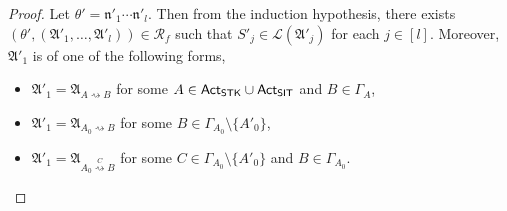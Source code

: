 \documentclass[preprint,12pt]{elsarticle}
\newcommand\act{{\sf Act}}
\newcommand\singletask{{\sf STK}}
\newcommand\singleinstance{{\sf SIT}}
\newcommand\aname{\mathfrak{n}}
\newcommand\AutReach{\mathscr{R}}
\newcommand\Aut{{\mathfrak{A} }}
\newcommand\Lang{{\mathscr{L} }}
\begin{document}
\begin{proof}
    Let $\theta'= \aname'_1 \cdots \aname'_l$. Then from the induction hypothesis, there exists $(\theta', (\Aut'_1, \dots, \Aut'_l)) \in \AutReach_f$ such that $S'_j \in \Lang(\Aut'_j)$ for each $j \in [l]$. Moreover, $\Aut'_1$ is of one of the following forms,
 \begin{itemize}
   \item  $\Aut'_1 = \Aut_{A \rightsquigarrow B}$ for some $A \in \act_\singletask \cup \act_\singleinstance$ and $B \in \Gamma_A$, 
   \item $\Aut'_1 = \Aut_{A_0 \rightsquigarrow B}$ for some $B \in \Gamma_{A_0} \setminus \{A'_0\}$, 
   \item $\Aut'_1 = \Aut_{A_0 \stackrel{C}{\rightsquigarrow} B}$ for some $C \in \Gamma_{A_0} \setminus \{A'_0\}$ and $B \in \Gamma_{A_0}$. 
  \end{itemize}
    

\end{proof}
\end{document}
